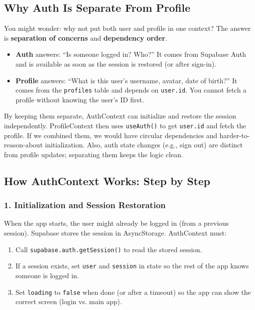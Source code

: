 \documentclass[11pt,a4paper]{article}
\begin{document}
\subsection{Why Auth Is Separate From Profile}

You might wonder: why not put both user and profile in one context? The answer is \textbf{separation of concerns} and \textbf{dependency order}.

\begin{itemize}[leftmargin=*]
    \item \textbf{Auth} answers: ``Is someone logged in? Who?'' It comes from Supabase Auth and is available as soon as the session is restored (or after sign-in).
    \item \textbf{Profile} answers: ``What is this user's username, avatar, date of birth?'' It comes from the \texttt{profiles} table and depends on \texttt{user.id}. You cannot fetch a profile without knowing the user's ID first.
\end{itemize}

By keeping them separate, AuthContext can initialize and restore the session independently. ProfileContext then uses \texttt{useAuth()} to get \texttt{user.id} and fetch the profile. If we combined them, we would have circular dependencies and harder-to-reason-about initialization. Also, auth state changes (e.g., sign out) are distinct from profile updates; separating them keeps the logic clean.

\subsection{How AuthContext Works: Step by Step}

\subsubsection{1. Initialization and Session Restoration}

When the app starts, the user might already be logged in (from a previous session). Supabase stores the session in AsyncStorage. AuthContext must:

\begin{enumerate}
    \item Call \texttt{supabase.auth.getSession()} to read the stored session.
    \item If a session exists, set \texttt{user} and \texttt{session} in state so the rest of the app knows someone is logged in.
    \item Set \texttt{loading} to \texttt{false} when done (or after a timeout) so the app can show the correct screen (login vs. main app).
\end{enumerate}
\end{document}
